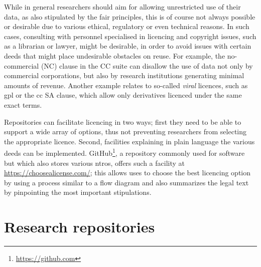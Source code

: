 While in general researchers should aim for allowing unrestricted use of their data, as also stipulated by the \gls{fair} principles, this is of course not always possible or desirable due to various ethical, regulatory or even technical reasons. In such cases, consulting with personnel specialised in licencing and copyright issues, such as a librarian or lawyer, might be desirable, in order to avoid issues with certain deeds that might place undesirable obstacles on reuse. For example, the no-commercial (NC) clause in the CC suite can disallow the use of data not only by commercial corporations, but also by research institutions generating minimal amounts of revenue\cite{ccbyncndrisks}. Another example relates to so-called \emph{viral} licences, such as \gls{gpl} or the \gls{cc} SA clause, which allow only derivatives licenced under the same exact terms.

Repositories can facilitate licencing in two ways; first they need to be able to support a wide array of options, thus not preventing researchers from selecting the appropriate licence. Second, facilities explaining in plain language the various deeds can be implemented. GitHub\footnote{\url{https://github.com}}, a repository commonly used for software but which also stores various \glspl{ntro}, offers such a facility at \url{https://choosealicense.com/}; this allows uses to choose the best licencing option by using a process similar to a flow diagram and also summarizes the legal text by pinpointing the most important stipulations.

\section{Research repositories}
\label{sec:research}